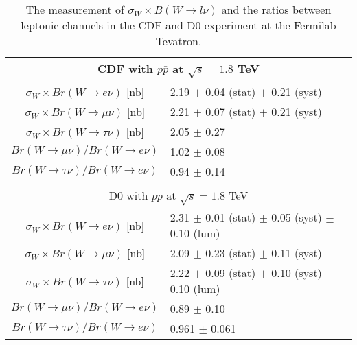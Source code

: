 \begin{table}[ht]
    \setlength{\tabcolsep}{0.5 em}
    \renewcommand{\arraystretch}{1.5}
    \centering
    \caption{The measurement of $\sigma_W \times B(W\to l \nu)$ and the ratios between leptonic channels in the CDF and D0 experiment at the Fermilab Tevatron.}
    \begin{tabular}{ |c|l| } 
         

         
         \hline
         \multicolumn{2}{|c|}{CDF with $p\bar{p}$ at $\sqrt{s}=1.8$ TeV} \\
         \hline
         $\sigma_W \times Br(W\to e    \nu)$  [nb] \cite{Abe:1990sd}    & 2.19 $\pm$ 0.04 (stat) $\pm$ 0.21 (syst) \\ 
         $\sigma_W \times Br(W\to \mu  \nu)$  [nb] \cite{Abe:1992ys}    & 2.21 $\pm$ 0.07 (stat) $\pm$ 0.21 (syst) \\ 
         $\sigma_W \times Br(W\to \tau \nu)$  [nb] \cite{Abe:1991fb}    & 2.05 $\pm$ 0.27 \\ 
         \hline
         $Br(W\to \mu  \nu)/ Br(W\to e \nu)$ \cite{Abe:1992ys} & 1.02  $\pm$ 0.08 \\
         $Br(W\to \tau \nu)/ Br(W\to e \nu)$ \cite{Abe:1991fb} & 0.94  $\pm$ 0.14 \\

         \hline
         
         \multicolumn{2}{c}{}  \\
         
         \hline
         \multicolumn{2}{|c|}{D0 with $p\bar{p}$ at $\sqrt{s}=1.8$ TeV} \\
         \hline
         $\sigma_W \times Br(W\to e    \nu)$  [nb] \cite{Abbott:1999tt} & 2.31 $\pm$ 0.01 (stat) $\pm$ 0.05 (syst) $\pm$ 0.10 (lum) \\ 
         $\sigma_W \times Br(W\to \mu  \nu)$  [nb] \cite{Abachi:1995xc} & 2.09 $\pm$ 0.23 (stat) $\pm$ 0.11 (syst) \\ 
         $\sigma_W \times Br(W\to \tau \nu)$  [nb] \cite{Abbott:1999pk} & 2.22 $\pm$ 0.09 (stat) $\pm$ 0.10 (syst) $\pm$ 0.10 (lum)  \\ 
         \hline
         $Br(W\to \mu  \nu)/ Br(W\to e \nu)$ \cite{Abachi:1995xc} & 0.89  $\pm$ 0.10 \\
         $Br(W\to \tau \nu)/ Br(W\to e \nu)$ \cite{Abbott:1999pk} & 0.961 $\pm$ 0.061 \\
         
         \hline
         
         
    \end{tabular}
    \label{tab:relatedWorks:lu:W:tevatron}
\end{table}
